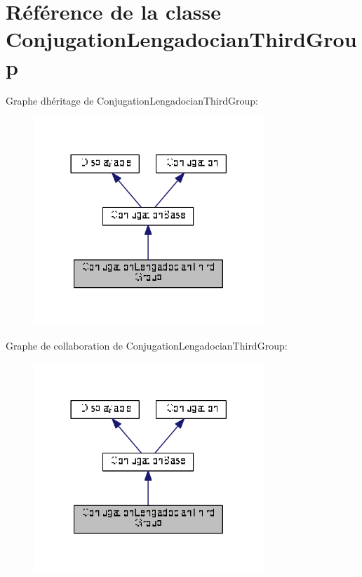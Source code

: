 \hypertarget{class_conjugation_lengadocian_third_group}{}\section{Référence de la classe Conjugation\+Lengadocian\+Third\+Group}
\label{class_conjugation_lengadocian_third_group}


Graphe d\textquotesingle{}héritage de Conjugation\+Lengadocian\+Third\+Group\+:
\nopagebreak
\begin{figure}[H]
\begin{center}
\leavevmode
\includegraphics[width=246pt]{class_conjugation_lengadocian_third_group__inherit__graph}
\end{center}
\end{figure}


Graphe de collaboration de Conjugation\+Lengadocian\+Third\+Group\+:
\nopagebreak
\begin{figure}[H]
\begin{center}
\leavevmode
\includegraphics[width=246pt]{class_conjugation_lengadocian_third_group__coll__graph}
\end{center}
\end{figure}
